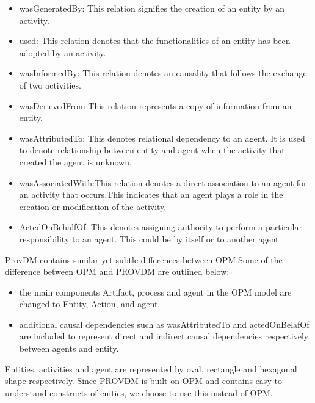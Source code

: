 \begin{itemize}
\item wasGeneratedBy: This relation signifies the creation of an entity by an activity. 

\item used: This relation denotes that the functionalities of an entity has been adopted by an activity.

\item wasInformedBy: This relation denotes an causality that follows the exchange of two activities.

\item wasDerievedFrom This relation represents a copy of information from an entity. 

\item wasAttributedTo: This denotes relational dependency to an agent. It is used to denote relationship between entity and agent when the activity that created the agent is unknown.

\item wasAssociatedWith:This relation denotes a direct association to an agent for an activity that occurs.This indicates that an agent plays a role in the creation or modification of the activity.

\item ActedOnBehalfOf: This denotes assigning authority to perform a particular responsibility to an agent. This could be by itself or to another agent.



\end{itemize}

Prov\-DM contains similar yet subtle differences between OPM.Some of the difference between OPM and PROV\-DM are outlined below:

\begin{itemize}

\item the main components Artifact, process and agent in the OPM model are changed to Entity, Action, and agent. 

\item additional causal dependencies such as wasAttributedTo and actedOnBelafOf are included to represent direct and indirect causal dependencies respectively between agents and entity.

\end{itemize}


Entities, activities and agent are represented by oval, rectangle and hexagonal shape respectively.
Since PROV\-DM is built on OPM and contains easy to understand constructs of enities, we choose to use this instead of OPM. 

